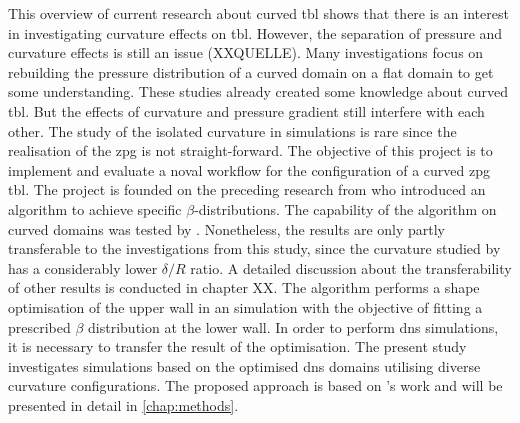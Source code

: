 This overview of current research about curved \acrshort{tbl} shows that there is an interest in investigating curvature effects on \acrshort{tbl}.
However, the separation of pressure and curvature effects is still an issue (XXQUELLE).
Many investigations focus on rebuilding the pressure distribution of a curved domain on a flat domain to get some understanding.
These studies already created some knowledge about curved \acrshort{tbl}.
But  the effects of curvature and pressure gradient still interfere with each other.
The study of the isolated curvature in simulations is rare since the realisation of the \acrshort{zpg} is not straight-forward.
The objective of this project is to implement and evaluate a noval workflow for the configuration of a curved \acrshort{zpg} \acrshort{tbl}.
The project is founded on the preceding research from \citet{morita_applying_2022} who introduced an algorithm to achieve specific $\beta$-distributions.
The capability of the algorithm on curved domains was tested by \citet{ganagdhar_bayesian_2025}.
Nonetheless, the results are only partly transferable to the investigations from this study, since the curvature studied by \citet{ganagdhar_bayesian_2025} has a considerably  lower $\delta/R$ ratio. 
A detailed discussion about the transferability of other results is conducted in chapter XX.
The algorithm performs a shape optimisation of the upper wall in an  simulation with the objective of fitting a prescribed $\beta$ distribution at the lower wall.
In order to perform \acrshort{dns} simulations, it is necessary to transfer the result of the optimisation.
The present study investigates simulations based on the optimised \acrshort{dns}  domains utilising   diverse curvature configurations.   
The proposed approach is based on \citet{schlatter_leveraging_nodate}'s work and will be presented in detail in \autoref{chap:methods}.




